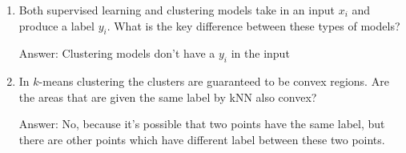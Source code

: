\documentclass{article}
\newcommand{\gre}[1]{\textcolor{gre}{#1}}
\newcommand\ans[1]{\par\gre{Answer: #1}}
\begin{document}
\begin{enumerate}
        \item Both supervised learning and clustering models take in an input $x_i$ and produce a label $y_i$. What is the key difference between these types of models?
        \ans{Clustering models don't have a $y_i$ in the input }

        \item In $k$-means clustering the clusters are guaranteed to be convex regions. Are the areas that are given the same label by kNN also convex?
        \ans{No, because it's possible that two points have the same label, but there are other points which have different label between these two points.}
    \end{enumerate}
\end{document}
